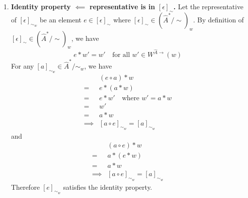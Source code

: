 \begin{proofE}
\begin{enumerate}[(1)]
    For \cref{eqn:identity_property_of_e_2}, we have
    \begin{align}
        & (e \circ a) \ast w = a \ast w \quad \text{for all $a \in \hat{A}^{*}$} \\
        \implies & e \ast (a \ast w) = a \ast w \quad \text{for all $a \in \hat{A}^{*}$} \\
        \implies & e \ast w' = w' \quad \textit{where $a \ast w = w'$} \quad \text{for all $a \in \hat{A}^{*}$}
    \end{align}
    Since this must hold for all $a \in \hat{A}^{*}$, $w'$ can be any world state that is reachable from $w$ (i.e., $w' \in W^{\hat{A}\to}(w)$).
    This gives us\footnote{Note that this condition includes \cref{eqn:identity_condition_e_1}.}
    \begin{equation}\label{eqn:identity_condition_e_2}
        e \ast w' = w' \quad \text{for all $w' \in W^{\hat{A}\to}(w)$}
    \end{equation}
    Since $\epsilon$ satisfies $\epsilon \ast w = w$ for all $w \in W$, \cref{eqn:identity_condition_e_2} is the definition for $e$ being an element of $[\epsilon]_{\sim} \in (\hat{A}^{*}/\sim)_{w}$.
    
   \item \textbf{Identity property $\impliedby$ representative is in $[\epsilon]_{\sim}$.}
   Let the representative of $[\epsilon]_{\sim_{w}}$ be an element $e \in [\epsilon]_{\sim}$ where $[\epsilon]_{\sim} \in (\hat{A}^{*}/\sim)_{w}$.
   By definition of $[\epsilon]_{\sim} \in (\hat{A}^{*}/\sim)_{w}$, we have
   \begin{equation}
       e \ast w' = w' \quad \text{for all $w' \in W^{\hat{A}\to}(w)$}
   \end{equation}
   For any $[a]_{\sim_{w}} \in \hat{A}^{*}/\sim_{w}$, we have
   \begin{align}
       & (e \circ a) \ast w \\
       = & e \ast (a \ast w) \\
       = & e \ast w' \quad \text{where $w' = a \ast w$} \\
       = & w' \\
       = & a \ast w \\
       \implies & [a \circ e]_{\sim_{w}} = [a]_{\sim_{w}}
   \end{align}
   and
   \begin{align}
       & (a \circ e) \ast w \\
       = & a \ast (e \ast w) \\
       = & a \ast w \\
       \implies & [a \circ e]_{\sim_{w}} = [a]_{\sim_{w}}
   \end{align}
    Therefore $[e]_{\sim_{w}}$ satisfies the identity property.
\end{enumerate}
\end{proofE}

